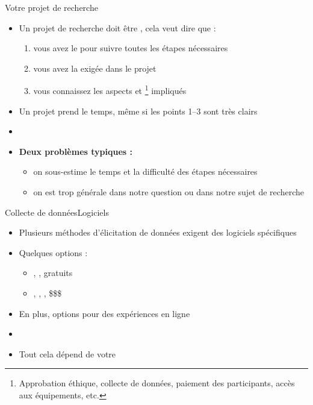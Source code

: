 \documentclass[xcolor=dvipsnames, onlymath, 10pt, aspectratio=169, handout]{beamer}
\begin{document}
\begin{frame}{Votre projet de recherche}{}
	\begin{itemize}
		\item Un projet de recherche doit être , cela veut dire que :
		      \begin{enumerate}
			      \item vous avez le  pour suivre toutes les étapes nécessaires
			      \item vous avez la  exigée dans le projet
			      \item vous connaissez les aspects  et \footnote{Approbation éthique, collecte de données, paiement des participants, accès aux équipements, etc.} impliqués
		      \end{enumerate}

		\item[\winner] Un projet prend le temps, même si les points 1--3 sont très clairs
		\item[]
		      \pause
		\item \textbf{Deux problèmes typiques :}
		      \begin{itemize}
			      \item on sous-estime le temps et la difficulté des étapes nécessaires
			      \item on est trop générale dans notre question ou dans notre sujet de recherche
		      \end{itemize}
	\end{itemize}
\end{frame}


\begin{frame}{Collecte de données}{Logiciels}

	\begin{itemize}
		\item Plusieurs méthodes d'élicitation de données exigent des logiciels spécifiques
		\item Quelques options :
		      \begin{itemize}
			      \item {}, ,  \hfill gratuits
			      \item {}, , , 	\hfill \$\$\$
		      \end{itemize}
		\item En plus,  options pour des expériences en ligne
		\item[]
		\item[\winner] Tout cela dépend de votre 
	\end{itemize}

\end{frame}
\end{document}
